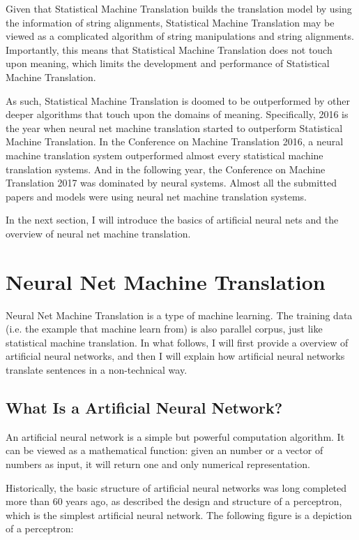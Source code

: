\documentclass[final]{ua-thesis}
\numberwithin{equation}{section}
\begin{document}
Given that Statistical Machine Translation builds the translation model by using the information of string alignments, Statistical Machine Translation may be viewed as a complicated algorithm of string manipulations and string alignments. 
Importantly, this means that Statistical Machine Translation does not touch upon meaning, which limits the development and performance of Statistical Machine Translation. 

As such, Statistical Machine Translation is doomed to be outperformed by other deeper algorithms that touch upon the domains of meaning. Specifically, 2016 is the year when neural net machine translation started to outperform Statistical Machine Translation. In the Conference on Machine Translation 2016, a neural machine translation system outperformed almost every statistical machine translation systems. And in the following year, the Conference on Machine Translation 2017 was dominated by neural systems. Almost all the submitted papers and models were using neural net machine translation systems. 

In the next section, I will introduce the basics of artificial neural nets and the overview of neural net machine translation.  

\section{Neural Net Machine Translation}\label{neural_MT}

Neural Net Machine Translation is a type of machine learning. The training data (i.e. the example that machine learn from) is also parallel corpus, just like statistical machine translation. 
In what follows, I will first provide a overview of artificial neural networks, and then I will explain how artificial neural networks translate sentences in a non-technical way.

\subsection{What Is a Artificial Neural Network?}

An artificial neural network is a simple but powerful computation algorithm. It can be viewed as a mathematical function: given an number or a vector of numbers as input, it will return one and only numerical representation. 

Historically, the basic structure of artificial neural networks was long completed more than 60 years ago, 
as \citet{rosenblatt} described the design and structure of a perceptron, which is the simplest artificial neural network. The following figure is a depiction of a perceptron: 
\end{document}
